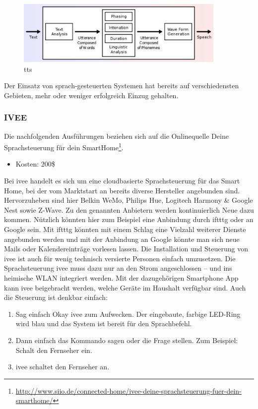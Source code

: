 \begin{figure}[h!]
	\centering
	\includegraphics[width=0.9\textwidth]{img/Feedback-Mechanismen/TTS.png}
	\caption{\gls{tts}}
	\label{fig:feedbackTTS}
\end{figure}

\newpage

Der Einsatz von sprach-gesteuerten Systemen hat bereits auf verschiedensten Gebieten, mehr oder weniger erfolgreich Einzug gehalten.

\subsubsection{IVEE}
Die nachfolgenden Ausführungen beziehen sich auf die Onlinequelle \glqq Deine Sprachsteuerung für dein SmartHome\grqq\footnote{\url{http://www.siio.de/connected-home/ivee-deine-sprachsteuerung-fuer-dein-smarthome/}}.

\begin{itemize}
\item Kosten: 200\$
\end{itemize}

\noindent
Bei ivee handelt es sich um eine cloudbasierte Sprachsteuerung für das Smart Home, bei der vom Marktstart an bereits diverse Hersteller angebunden sind. Hervorzuheben sind hier Belkin WeMo, Philips Hue, Logitech Harmony \& Google Nest sowie Z-Wave. Zu den genannten Anbietern werden kontinuierlich Neue dazu kommen. Nützlich könnten hier zum Beispiel eine Anbindung durch \gls{iftttg} oder an Google sein. Mit \gls{iftttg} könnten mit einem Schlag eine Vielzahl weiterer Dienste angebunden werden und mit der Anbindung an Google könnte man sich neue Mails oder Kalendereinträge vorlesen lassen. Die Installation und Steuerung von ivee ist auch für wenig technisch versierte Personen einfach umzusetzen. Die Sprachsteuerung ivee muss dazu nur an den Strom angeschlossen – und ins heimische WLAN integriert werden. Mit der dazugehörigen Smartphone App kann ivee beigebracht werden, welche Geräte im Haushalt verfügbar sind. Auch die Steuerung ist denkbar einfach:

\begin{enumerate}
\item Sag einfach \glqq Okay ivee\grqq{} zum Aufwecken. Der eingebaute, farbige LED-Ring wird blau und das System ist bereit für den Sprachbefehl.
\item Dann einfach das Kommando sagen oder die Frage stellen. Zum Beispiel: \glqq Schalt den Fernseher ein\grqq .
\item ivee schaltet den Fernseher an.\\
\end{enumerate}

